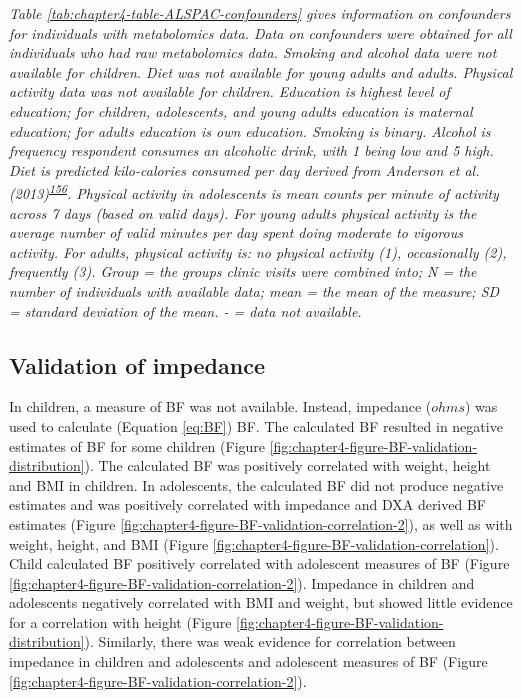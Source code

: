 \documentclass[11pt,twoside]{bristolthesis}
\newcommand{\bsmall}{\begin{small}}
\newcommand{\esmall}{\end{small}}
\begin{document}
\noindent 
\bsmall
\emph{Table \ref{tab:chapter4-table-ALSPAC-confounders} gives information on confounders for individuals with metabolomics data. Data on confounders were obtained for all individuals who had raw metabolomics data. Smoking and alcohol data were not available for children. Diet was not available for young adults and adults. Physical activity data was not available for children. Education is highest level of education; for children, adolescents, and young adults education is maternal education; for adults education is own education. Smoking is binary. Alcohol is frequency respondent consumes an alcoholic drink, with 1 being low and 5 high. Diet is predicted kilo-calories consumed per day derived from Anderson et al. (2013)\textsuperscript{\protect\hyperlink{ref-Anderson2013}{156}}. Physical activity in adolescents is mean counts per minute of activity across 7 days (based on valid days). For young adults physical activity is the average number of valid minutes per day spent doing moderate to vigorous activity. For adults, physical activity is: no physical activity (1), occasionally (2), frequently (3). Group = the groups clinic visits were combined into; N = the number of individuals with available data; mean = the mean of the measure; SD = standard deviation of the mean. - = data not available.}
\esmall

\hypertarget{validation-of-impedance}{%
\subsection{Validation of impedance}\label{validation-of-impedance}}

In children, a measure of BF was not available. Instead, impedance (\(ohms\)) was used to calculate (Equation \eqref{eq:BF}) BF. The calculated BF resulted in negative estimates of BF for some children (Figure \ref{fig:chapter4-figure-BF-validation-distribution}). The calculated BF was positively correlated with weight, height and BMI in children. In adolescents, the calculated BF did not produce negative estimates and was positively correlated with impedance and DXA derived BF estimates (Figure \ref{fig:chapter4-figure-BF-validation-correlation-2}), as well as with weight, height, and BMI (Figure \ref{fig:chapter4-figure-BF-validation-correlation}). Child calculated BF positively correlated with adolescent measures of BF (Figure \ref{fig:chapter4-figure-BF-validation-correlation-2}). Impedance in children and adolescents negatively correlated with BMI and weight, but showed little evidence for a correlation with height (Figure \ref{fig:chapter4-figure-BF-validation-distribution}). Similarly, there was weak evidence for correlation between impedance in children and adolescents and adolescent measures of BF (Figure \ref{fig:chapter4-figure-BF-validation-correlation-2}).
\end{document}
